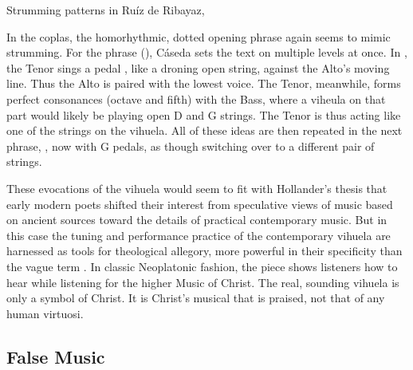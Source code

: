 
{Strumming patterns in Ruíz de Ribayaz, }

In the coplas, the homorhythmic, dotted opening phrase again seems to mimic
strumming.
For the phrase  (),
Cáseda sets the text on multiple levels at once.
In , the Tenor sings a pedal , like a droning open
string, against the Alto's moving line.
Thus the  Alto is paired with the lowest voice.
The Tenor, meanwhile, forms perfect consonances (octave and fifth) with the
Bass, where a viheula on that part would likely be playing open D and G strings. 
The Tenor is thus acting like one of the strings on the vihuela.
All of these ideas are then repeated in the next phrase, , now
with G pedals, as though switching over to a different pair of strings.

These evocations of the vihuela would seem to fit with Hollander's thesis that
early modern poets shifted their interest from speculative views of music based
on ancient sources toward the details of practical contemporary music.
But in this case the tuning and performance practice of the contemporary
vihuela are harnessed as tools for theological allegory, more powerful in their
specificity than the vague term .
In classic Neoplatonic fashion, the piece shows listeners how to hear
 while listening for the higher Music of Christ. 
The real, sounding vihuela is only a symbol of Christ.
It is Christ's musical  that is praised, not that of any
human virtuosi.


\subsection{False Music}

